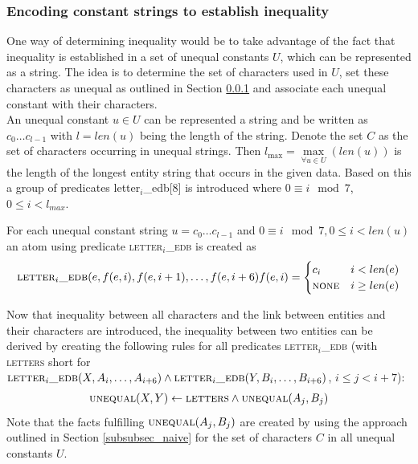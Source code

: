 \documentclass[hyperref,bachelorofscience,fleqn]{cgvpub}
\begin{document}
\subsubsection{Encoding constant strings to establish inequality}\label{subsubsec_encoding}
One way of determining inequality would be to take advantage of the fact that inequality is established in a set of unequal constants \(U\), which can be represented as a string. The idea is to determine the set of characters used in \(U\), set these characters as unequal as outlined in Section \ref{subsubsec_encoding} and associate each unequal constant with their characters.\\

An unequal constant \(u \in U\) can be represented a string and be written as \(c_0 \ldots c_{l - 1}\) with \(l = len(u)\) being the length of the string. Denote the set \(C\) as the set of characters occurring in unequal strings. Then \(l_{\max} = \max\limits_{\forall u \in U}(len(u))\) is the length of the longest entity string that occurs in the given data.
Based on this a group of predicates letter\(_i\)\_edb[8] is introduced where \(0 \equiv i \mod 7\), \(0 \leq i < l_{max} \). 

For each unequal constant string \(u = c_0 \ldots c_{l - 1}\) and \(0 \equiv i \mod 7, 0 \leq i < len(u)\) an atom using predicate \textsc{letter\(_i\)\_edb} is created as 
\begin{align}
\begin{split}
\textsc{letter}_i\textsc{\_edb}(e, f(e, i), f(e, i+1), \ldots, f(e, i+6)
\end{split}
\begin{split}
f(e, i) = 
\begin{cases}
      c_i & i < len(e) \\
      \textsc{none} & i \geq len(e)
\end{cases}
\end{split}
\end{align}

Now that inequality between all characters and the link between entities and their characters are introduced, the inequality between two entities can be derived by creating the following rules for all predicates \textsc{letter\(_i\)\_edb} (with \textsc{letters} short for \(\textsc{letter}_i\textsc{\_edb}(X, A_i, \ldots, A_{i+6}) \wedge\textsc{letter}_i\textsc{\_edb}(Y, B_i, \ldots, B_{i+6})\), \(i \leq j < i + 7\)):
\begin{align}
\textsc{unequal}(X, Y) \leftarrow \textsc{letters} \wedge \textsc{unequal}(A_j, B_j)
\end{align}
Note that the facts fulfilling \(\textsc{unequal}(A_j, B_j)\) are created by using the approach outlined in Section \ref{subsubsec_naive} for the set of characters \(C\) in all unequal constants \(U\).	
\end{document}
